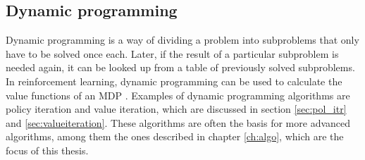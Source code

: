 \subsection{Dynamic programming}

Dynamic programming is a way of dividing a problem into subproblems that only have to be solved once each. Later, if the result of a particular subproblem is needed again, it can be looked up from a table of previously solved subproblems. In reinforcement learning, dynamic programming can be used to calculate the value functions of an MDP \parencite{bellman1957mdp}. Examples of dynamic programming algorithms are policy iteration and value iteration, which are discussed in section \ref{sec:pol_itr} and \ref{sec:valueiteration}. These algorithms are often the basis for more advanced algorithms, among them the ones described in chapter \ref{ch:algo}, which are the focus of this thesis. 
